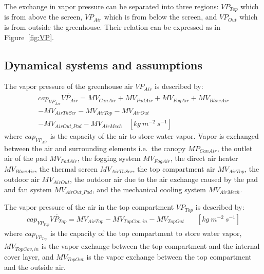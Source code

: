 \documentclass[a4paper]{article}
\numberwithin{equation}{section}
\begin{document}
The exchange in vapor pressure can be separated into three regions: \( VP_{Top} \) which is from above the screen, \( VP_{Air} \) which is from below the screen, and \( VP_{Out} \) which is from outside the greenhouse.
Their relation can be expressed as in Figure~\ref{fig:VP}.

\subsection{Dynamical systems and assumptions}
The vapor pressure of the greenhouse air \( VP_{Air} \) is described by:
\begin{multline*}
  cap_{VP_{Air}}\dot{VP_{Air}} = MV_{CanAir} + MV_{PadAir} + MV_{FogAir} + MV_{BlowAir} \\
  - MV_{AirThScr} - MV_{AirTop} - MV_{AirOut} \\
  - MV_{AirOut\_Pad} - MV_{AirMech} ~~~~ [kg\ m^{-2}\ s^{-1}]
\end{multline*}
where \( cap_{VP_{Air}} \) is the capacity of the air to store water vapor.
Vapor is exchanged between the air and surrounding elements i.e.\ the canopy \( MP_{CanAir} \), the outlet air of the pad \( MV_{PadAir} \), the fogging system \( MV_{FogAir} \), the direct air heater \( MV_{BlowAir} \), the thermal screen \( MV_{AirThScr} \), the top compartment air \( MV_{AirTop} \), the outdoor air \( MV_{AirOut} \), the outdoor air due to the air exchange caused by the pad and fan system \( MV_{AirOut\_Pad} \), and the mechanical cooling system \( MV_{AirMech} \).

The vapor pressure of the air in the top compartment \( VP_{Top} \) is described by:
\begin{multline*}
  cap_{VP_{Top}}\dot{VP_{Top}} = MV_{AirTop} - MV_{TopCov,in} - MV_{TopOut} ~~~~~~~~ [kg\ m^{-2}\ s^{-1}]
\end{multline*}
where \( cap_{VP_{Top}} \) is the capacity of the top compartment to store water vapor, \( MV_{TopCov,in} \) is the vapor exchange between the top compartment and the internal cover layer, and \( MV_{TopOut} \) is the vapor exchange between the top compartment and the outside air.
\end{document}

